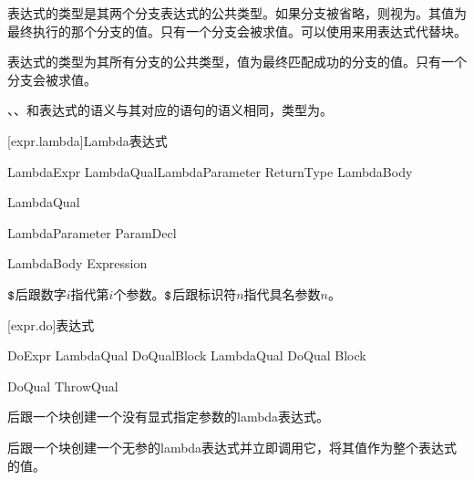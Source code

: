 \pnum
{}表达式的类型是其两个分支表达式的公共类型。如果分支被省略，则视为。其值为最终执行的那个分支的值。只有一个分支会被求值。可以使用来用表达式代替块。

\pnum
{}表达式的类型为其所有分支的公共类型，值为最终匹配成功的分支的值。只有一个分支会被求值。

\pnum
{}、、和表达式的语义与其对应的语句的语义相同，类型为。

[expr.lambda]{Lambda表达式}

\begin{bnf}{LambdaExpr}
    LambdaQual\bnfs LambdaParameter ReturnType\bnfs \terminal{=>} LambdaBody
\end{bnf}

\begin{bnf}{LambdaQual}
\end{bnf}

\begin{bnf}{LambdaParameter}
    ParamDecl
\end{bnf}

\begin{bnf}{LambdaBody}
    Expression
\end{bnf}

\pnum
$\texttt{\$}$后跟数字$i$指代第$i$个参数。$\texttt{\$}$后跟标识符$n$指代具名参数$n$。

[expr.do]{表达式}

\begin{bnf}{DoExpr}
    LambdaQual\bnfs {} DoQual\bnfs Block \br
    LambdaQual\bnfs {} DoQual\bnfs \terminal{!} Block
\end{bnf}

\begin{bnf}{DoQual}
    ThrowQual
\end{bnf}

\pnum
{}后跟一个块创建一个没有显式指定参数的lambda表达式。

\pnum
{}后跟一个块创建一个无参的lambda表达式并立即调用它，将其值作为整个表达式的值。

\enterexample
{}
\exitexample

